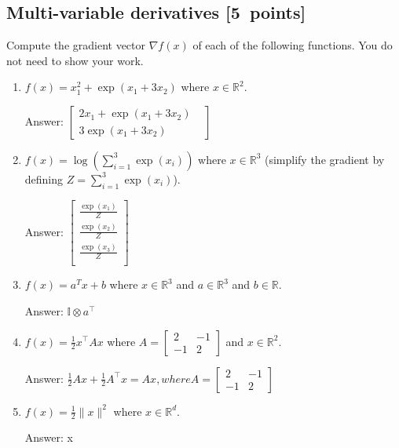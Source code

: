 \documentclass{article}
\newcommand{\blu}[1]{{\textcolor{blu}{#1}}}
\newenvironment{answer}{\par\begingroup\color{gre}Answer: }{\endgroup}
\let\ask\blu
\newcommand\pts[1]{\textcolor{pointscolour}{[#1~points]}}
\def\R{\mathbb{R}}
\newcommand{\norm}[1]{\lVert #1 \rVert}
\begin{document}
  \subsection{Multi-variable derivatives \pts{5}}
  \label{sub.multi.var}

  \ask{Compute the gradient vector $\nabla f(x)$ of each of the following functions.} You do not need to show your work.
  \begin{enumerate}
  \item $f(x) = x_1^2 + \exp(x_1 + 3x_2)$ where $x \in \R^2$.
  \begin{answer}
  $\left[\begin{array}{cc}
       2x_1 + \exp(x_1 + 3x_2)  \\
       3\exp(x_1 + 3x_2)& 
  \end{array}\right]$
  \end{answer}
  \item $f(x) = \log\left(\sum_{i=1}^3\exp(x_i)\right)$ where $x \in \R^3$ (simplify the gradient by defining $Z = \sum_{i=1}^3\exp(x_i)$).
  
  \begin{answer}
  $\left[\begin{array}{ccc}
       \frac{\exp(x_1)}{Z}  \\
       \frac{\exp(x_2)}{Z}  \\
       \frac{\exp(x_3)}{Z} \\
  \end{array}\right]$
  \end{answer}
  \item $f(x) = a^Tx + b$ where $x \in \R^3$ and $a \in \R^3$ and $b \in \R$.
  \begin{answer}
  $\mathbb{I}\otimes a^\top$
  \end{answer}
  
  \item $f(x) = \frac12 x^\top A x$ where $A=\left[ \begin{array}{cc}
  2 & -1 \\
  -1 & 2 \end{array} \right]$ and $x \in \mathbb{R}^2$.
  \begin{answer}
  $\frac{1}{2}A x + \frac{1}{2}A^\top x = Ax, where A =\left[ \begin{array}{cc}
  2 & -1 \\
  -1 & 2 \end{array} \right] $
  \end{answer}
  \item $f(x) = \frac{1}{2}\norm{x}^2$ where $x \in \R^d$.
  \begin{answer}
  x
  \end{answer}
  \end{enumerate}
\end{document}
